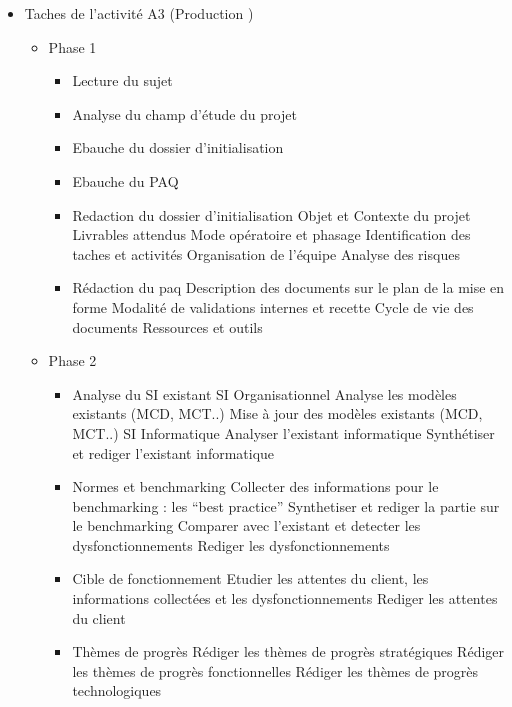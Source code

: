 \begin{itemize}
    \item Taches de l’activité A3 (Production )
    \begin{itemize}
        \item Phase 1
        \begin{itemize}
            \item Lecture du sujet
            \item Analyse du champ d’étude du projet
            \item Ebauche du dossier d’initialisation
            \item Ebauche du PAQ
            \item Redaction du dossier d’initialisation
                \subitem Objet et Contexte du projet
                \subitem Livrables attendus
                \subitem Mode opératoire et phasage
                \subitem Identification des taches et activités
                \subitem Organisation de l’équipe
                \subitem Analyse des risques
            \item Rédaction du paq
                \subitem Description des documents sur le plan de la mise en forme
                \subitem Modalité de validations internes et recette
                \subitem Cycle de vie des documents
                \subitem Ressources et outils
        \end{itemize}

        \item Phase 2
        \begin{itemize}
            \item Analyse du SI existant
                \subitem SI Organisationnel
                    \subsubitem Analyse les modèles existants (MCD, MCT..)
                    \subsubitem Mise à jour des modèles existants (MCD, MCT..)
                \subitem SI Informatique
                    \subsubitem Analyser l’existant informatique
                    \subsubitem Synthétiser et rediger l’existant informatique
            \item Normes et benchmarking
                \subitem Collecter des informations pour le benchmarking : les “best practice”
                \subitem Synthetiser et rediger la partie sur le benchmarking
                \subitem Comparer avec l’existant et detecter les dysfonctionnements
                \subitem Rediger les dysfonctionnements
            \item Cible de fonctionnement
                \subitem Etudier les attentes du client, les informations collectées et les dysfonctionnements
                \subitem Rediger les attentes du client
            \item Thèmes de progrès
                \subitem Rédiger les thèmes de progrès stratégiques
                \subitem Rédiger les thèmes de progrès fonctionnelles
                \subitem Rédiger les thèmes de progrès technologiques
        \end{itemize}


\end{itemize}
\end{itemize}
